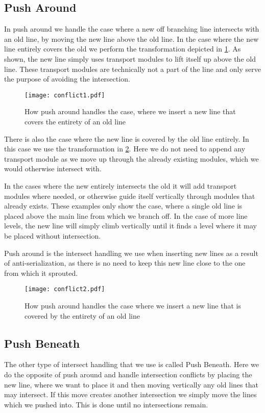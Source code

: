 \subsection{Push Around} \label{ssec:paround}
In push around we handle the case where a new off branching line intersects with an old line, by moving the new line above the old line. In the case where the new line entirely covers the old we perform the transformation depicted in \cref{fig:pusharound1}. As shown, the new line simply uses transport modules to lift itself up above the old line. These transport modules are technically not a part of the line and only serve the purpose of avoiding the intersection.

\begin{figure}[h]
\centering
\texttt{[image: conflict1.pdf]}
\caption{How push around handles the case, where we insert a new line that covers the entirety of an old line}
\label{fig:pusharound1}
\end{figure}

There is also the case where the new line is covered by the old line entirely. In this case we use the transformation in \cref{fig:pusharound2}. Here we do not need to append any transport module as we move up through the already existing modules, which we would otherwise intersect with. 

In the cases where the new entirely intersects the old it will add transport modules where needed, or otherwise guide itself vertically through modules that already exists. These examples only show the case, where a single old line is placed above the main line from which we branch off. In the case of more line levels, the new line will simply climb vertically until it finds a level where it may be placed without intersection. 

Push around is the intersect handling we use when inserting new lines as a result of anti-serialization, as there is no need to keep this new line close to the one from which it sprouted. 

\begin{figure}[H]
\centering
\texttt{[image: conflict2.pdf]}
\caption{How push around handles the case where we insert a new line that is covered by the entirety of an old line}
\label{fig:pusharound2}
\end{figure}

\subsection{Push Beneath} \label{ssec:pbeneath}
The other type of intersect handling that we use is called Push Beneath. Here we do the opposite of push around and handle intersection conflicts by placing the new line, where we want to place it and then moving vertically any old lines that may intersect. If this move creates another intersection we simply move the lines which we pushed into. This is done until no intersections remain. 

